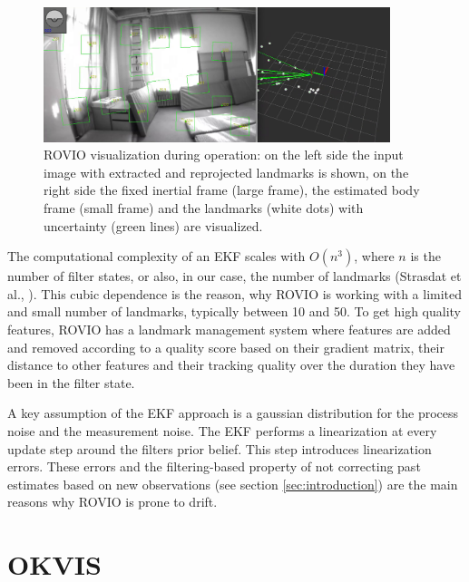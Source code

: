 \begin{figure}
   \centering
   \includegraphics[width=0.9\textwidth]{images/rovio_frontend.png}
   \caption{ROVIO visualization during operation: on the left side the input image with extracted and reprojected landmarks is shown, on the right side the fixed inertial frame (large frame), the estimated body frame (small frame) and the landmarks (white dots) with uncertainty (green lines) are visualized.}
   \label{pics:rovio_frontend}
\end{figure}

The computational complexity of an EKF scales with $O(n^3)$, where $n$ is the number of filter states, or also, in our case, the number of landmarks (Strasdat et al., \cite{strasdat2010real}). This cubic dependence is the reason, why ROVIO is working with a limited and small number of landmarks, typically between 10 and 50. To get high quality features, ROVIO has a landmark management system where features are added and removed according to a quality score based on their gradient matrix, their distance to other features and their tracking quality over the duration they have been in the filter state. 

A key assumption of the EKF approach is a gaussian distribution for the process noise and the measurement noise. The EKF performs a linearization at every update step around the filters prior belief. This step introduces linearization errors. These errors and the filtering-based property of not correcting past estimates based on new observations (see section \ref{sec:introduction}) are the main reasons why ROVIO is prone to drift.



\section{OKVIS}
\label{sec:okvis}

